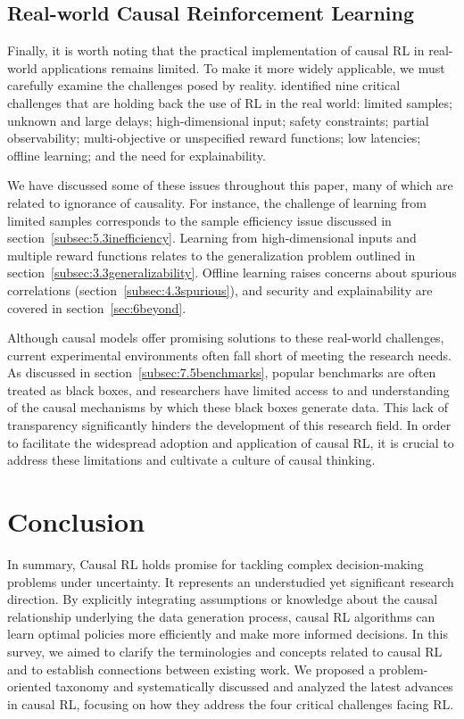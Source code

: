 \documentclass[10pt]{article} %
\theoremstyle{definition}
\begin{document}
\subsection{Real-world Causal Reinforcement Learning}
\label{subsec:7.6real-world}

Finally,  it is worth noting that the practical implementation of causal RL in real-world applications remains limited. To make it more widely applicable, we must carefully examine the challenges posed by reality. \citet{dulac-arnoldEmpiricalInvestigationChallenges2020a, dulac-arnoldChallengesRealworldReinforcement2021a} identified nine critical challenges that are holding back the use of RL in the real world: limited samples; unknown and large delays; high-dimensional input; safety constraints; partial observability; multi-objective or unspecified reward functions; low latencies; offline learning; and the need for explainability. 

We have discussed some of these issues throughout this paper, many of which are related to ignorance of causality. For instance, the challenge of learning from limited samples corresponds to the sample efficiency issue discussed in section~\ref{subsec:5.3inefficiency}. Learning from high-dimensional inputs and multiple reward functions relates to the generalization problem outlined in section~\ref{subsec:3.3generalizability}. Offline learning raises concerns about spurious correlations (section~\ref{subsec:4.3spurious}), and security and explainability are covered in section~\ref{sec:6beyond}. 

Although causal models offer promising solutions to these real-world challenges, current experimental environments often fall short of meeting the research needs. As discussed in section~\ref{subsec:7.5benchmarks}, popular benchmarks are often treated as black boxes, and researchers have limited access to and understanding of the causal mechanisms by which these black boxes generate data. This lack of transparency significantly hinders the development of this research field. 
In order to facilitate the widespread adoption and application of causal RL, it is crucial to address these limitations and cultivate a culture of causal thinking.

%
%
\section{Conclusion}
In summary, Causal RL holds promise for tackling complex decision-making problems under uncertainty. 
It represents an understudied yet significant research direction.
By explicitly integrating assumptions or knowledge about the causal relationship underlying the data generation process, causal RL algorithms can learn optimal policies more efficiently and make more informed decisions. 
In this survey, we aimed to clarify the terminologies and concepts related to causal RL and to establish connections between existing work. 
We proposed a problem-oriented taxonomy and systematically discussed and analyzed the latest advances in causal RL, focusing on how they address the four critical challenges facing RL.
\end{document}
